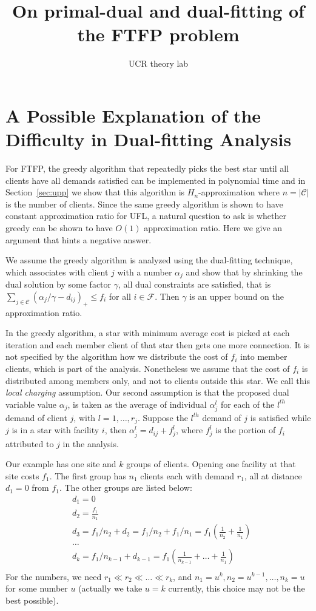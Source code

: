 \documentclass[11pt]{article}
\title{On primal-dual and dual-fitting of the FTFP problem}
\author{UCR theory lab}
\begin{document}
\maketitle

\section{A Possible Explanation of the Difficulty in Dual-fitting Analysis}
For FTFP, the greedy algorithm that repeatedly picks the best star
until all clients have all demands satisfied can be implemented in
polynomial time and in Section~\ref{sec:upp} we show that this
algorithm is $H_n$-approximation where $n=|\mathcal C|$ is the number
of clients. Since the same greedy algorithm is shown to have constant
approximation ratio for UFL, a natural question to ask is whether
greedy can be shown to have $O(1)$ approximation ratio. Here we give
an argument that hints a negative answer.

We assume the greedy algorithm is analyzed using the dual-fitting
technique, which associates with client $j$ with a number $\alpha_j$
and show that by shrinking the dual solution by some factor $\gamma$,
all dual constraints are satisfied, that is $\sum_{j\in \mathcal C}
(\alpha_j/\gamma - d_{ij})_+ \leq f_i$ for all $i\in \mathcal F$. Then
$\gamma$ is an upper bound on the approximation ratio.

In the greedy algorithm, a star with minimum average cost is picked at
each iteration and each member client of that star then gets one more
connection. It is not specified by the algorithm how we distribute the
cost of $f_i$ into member clients, which is part of the
analysis. Nonetheless we assume that the cost of $f_i$ is distributed
among members only, and not to clients outside this star. We call this
\emph{local charging} assumption. Our second assumption is that the
proposed dual variable value $\alpha_j$, is taken as the average of
individual $\alpha_j^l$ for each of the $l^{th}$ demand of client $j$,
with $l=1,\ldots,r_j$. Suppose the $l^{th}$ demand of $j$ is satisfied
while $j$ is in a star with facility $i$, then $\alpha_j^l = d_{ij} +
f_j^l$, where $f_j^l$ is the portion of $f_i$ attributed to $j$ in the
analysis.

Our example has one site and $k$ groups of clients. Opening one facility
at that site costs $f_1$. The first group has $n_1$ clients each with
demand $r_1$, all at distance $d_1 = 0$ from $f_1$. The other groups
are listed below:
\begin{align*}
  &d_1 = 0\\
  &d_2 = \frac{f_1}{n_1}\\
  &d_3 = f_1/n_2 + d_2 = f_1/n_2 + f_1/n_1 = f_1 (\frac{1}{n_2} + \frac{1}{n_1})\\
  &\ldots\\
  &d_k = f_1/n_{k-1} + d_{k-1} = f_1 (\frac{1}{n_{k-1}} + \ldots + \frac{1}{n_1})\\
\end{align*}
For the numbers, we need $r_1 \ll r_2 \ll \ldots \ll r_k$, and $n_1 =
u^k, n_2 = u^{k-1}, \ldots, n_k = u$ for some number $u$ (actually we
take $u=k$ currently, this choice may not be the best possible).
\end{document}
